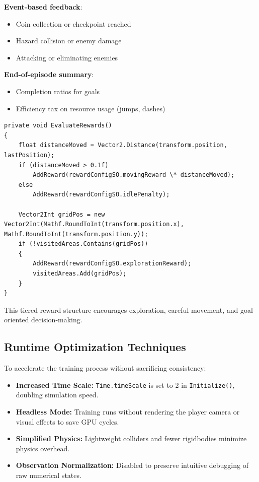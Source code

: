 \documentclass[12pt,oneside,openright,a4paper]{cpe-english-project}
\begin{document}
\textbf{Event-based feedback}:
\begin{itemize}
\item Coin collection or checkpoint reached
\item Hazard collision or enemy damage
\item Attacking or eliminating enemies
\end{itemize}

\textbf{End-of-episode summary}:
\begin{itemize}
\item Completion ratios for goals
\item Efficiency tax on resource usage (jumps, dashes)
\end{itemize}

\begin{lstlisting}[language={[Sharp]C}]
private void EvaluateRewards()
{
	float distanceMoved = Vector2.Distance(transform.position, lastPosition);
	if (distanceMoved > 0.1f)
		AddReward(rewardConfigSO.movingReward \* distanceMoved);
	else
		AddReward(rewardConfigSO.idlePenalty);
	
	Vector2Int gridPos = new Vector2Int(Mathf.RoundToInt(transform.position.x), Mathf.RoundToInt(transform.position.y));
	if (!visitedAreas.Contains(gridPos))
	{
		AddReward(rewardConfigSO.explorationReward);
		visitedAreas.Add(gridPos);
	}
}
\end{lstlisting}

This tiered reward structure encourages exploration, careful movement, and goal-oriented decision-making.


\subsection{Runtime Optimization Techniques}

To accelerate the training process without sacrificing consistency:

\begin{itemize}
\item \textbf{Increased Time Scale:} \texttt{Time.timeScale} is set to 2 in \texttt{Initialize()}, doubling simulation speed.
\item \textbf{Headless Mode:} Training runs without rendering the player camera or visual effects to save GPU cycles.
\item \textbf{Simplified Physics:} Lightweight colliders and fewer rigidbodies minimize physics overhead.
\item \textbf{Observation Normalization:} Disabled to preserve intuitive debugging of raw numerical states.
\end{itemize}
\end{document}
